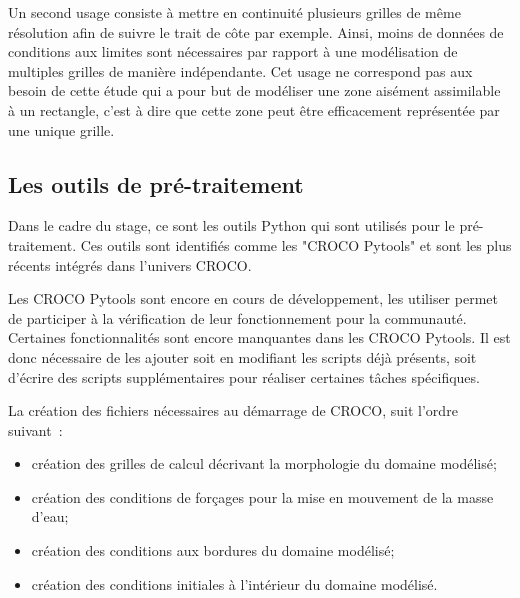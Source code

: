 \documentclass[10pt,a4paper,titlepage]{article}
\begin{document}
Un second usage consiste à mettre en continuité plusieurs grilles de même résolution afin de suivre le trait de côte par exemple.
Ainsi, moins de données de conditions aux limites sont nécessaires par rapport à une modélisation de multiples grilles de manière indépendante.
Cet usage ne correspond pas aux besoin de cette étude qui a pour but de modéliser une zone aisément assimilable à un rectangle, c'est à dire que cette zone peut être efficacement représentée par une unique grille.


\subsection{Les outils de pré-traitement}

Dans le cadre du stage, ce sont les outils Python qui sont utilisés pour le pré-traitement. Ces outils sont identifiés comme les "CROCO Pytools" et sont les plus récents intégrés dans l'univers CROCO.

Les CROCO Pytools sont encore en cours de développement, les utiliser permet de participer à la vérification de leur fonctionnement pour la communauté.
Certaines fonctionnalités sont encore manquantes dans les CROCO Pytools. Il est donc nécessaire de les ajouter soit en modifiant les scripts déjà présents, soit d'écrire des scripts supplémentaires pour réaliser certaines tâches spécifiques.

La création des fichiers nécessaires au démarrage de CROCO, suit l'ordre suivant\ :

\begin{itemize}
    \item création des grilles de calcul décrivant la morphologie du domaine modélisé;
    \item création des conditions de forçages pour la mise en mouvement de la masse d'eau;
    \item création des conditions aux bordures du domaine modélisé;
    \item création des conditions initiales à l'intérieur du domaine modélisé.
\end{itemize}
\end{document}
